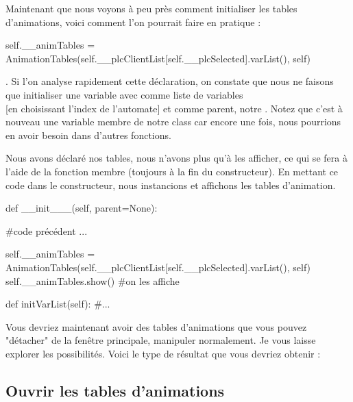\documentclass[12pt]{report}    %
\begin{document}
Maintenant que nous voyons à peu près comment initialiser les tables d'animations, voici comment l'on pourrait faire en pratique :
\begin{pyCode}
self.__animTables = AnimationTables(self.__plcClientList[self.__plcSelected].varList(), self)
\end{pyCode}
.
Si l'on analyse rapidement cette déclaration, on constate que nous ne faisons que initialiser une variable  avec comme liste de variables \\  [en choisissant l'index de l'automate] et comme parent, notre .\newline
Notez que c'est à nouveau une variable membre de notre class  car encore une fois, nous pourrions en avoir besoin dans d'autres fonctions.\smallSkip

Nous avons déclaré nos tables, nous n'avons plus qu'à les afficher, ce qui se fera à l'aide de la fonction membre  (toujours à la fin du constructeur).
En mettant ce code dans le constructeur, nous instancions et affichons les tables d'animation.
\begin{pyCode}

def __init___(self, parent=None):

    #code précédent ...
    
    self.__animTables = AnimationTables(self.__plcClientList[self.__plcSelected].varList(), self)
    self.__animTables.show() #on les affiche
    
def initVarList(self):
    #...
\end{pyCode}
\smallSkip

\smallSkip

Vous devriez maintenant avoir des tables d'animations que vous pouvez "détacher" de la fenêtre principale, manipuler normalement. Je vous laisse explorer les possibilités.\newline
Voici le type de résultat que vous devriez obtenir :


\subsection{Ouvrir les tables d'animations}
\end{document}
